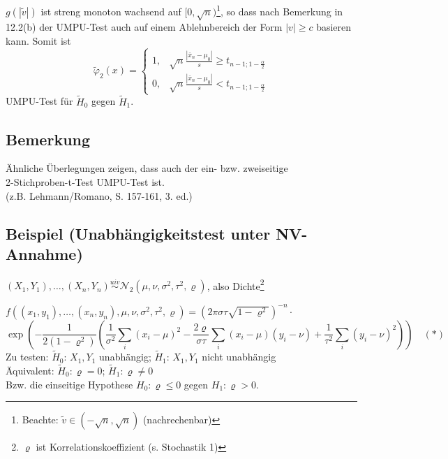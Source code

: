 \documentclass[a4paper,11pt,twoside,titlepage]{article}
\newcommand\NN{ \mathcal{N} } %
\newcommand{\uiv}{\ensuremath{\stackrel{uiv}{\sim}}}
\begin{document}
\begin{itemize}
$g(|\tilde v|)$ ist streng monoton wachsend auf $[0,\sqrt n)$\footnote{Beachte: $\tilde v\in(-\sqrt n,\sqrt n)$ (nachrechenbar)}, so dass nach Bemerkung in 12.2(b) der UMPU-Test auch auf einem Ablehnbereich der Form $|v|\geq c$ basieren kann. Somit ist
$$\tilde\varphi_2(x)=\left\{\begin{array}{cl}
1,&\sqrt{n}\frac{|\bar{x}_n-\mu_0|}{s}\geq t_{n-1;1-\frac\alpha2}\\0,&\sqrt{n}\frac{|\bar{x}_n-\mu_0|}{s}< t_{n-1;1-\frac\alpha2}\end{array}\right.$$
UMPU-Test für $\tilde H_0$ gegen $\tilde H_1$.
\end{itemize}

\subsection{Bemerkung}
Ähnliche Überlegungen zeigen, dass auch der ein- bzw. zweiseitige\\ 2-Stichproben-t-Test UMPU-Test ist.\\
(z.B. Lehmann/Romano, S. 157-161, 3. ed.)

\subsection{Beispiel (Unabhängigkeitstest unter NV-Annahme)}
$(X_1,Y_1),\ldots,(X_n,Y_n)\uiv\NN_2(\mu,\nu,\sigma^2,\tau^2,\varrho)$, also Dichte\footnote{$\varrho$ ist Korrelationskoeffizient (s. Stochastik 1)}

$f((x_1,y_1),\ldots,(x_n,y_n),\mu,\nu,\sigma^2,\tau^2,\varrho)=(2\pi\sigma\tau\sqrt{1-\varrho^2})^{-n}\cdot$\[\exp(-\frac{1}{2(1-\varrho^2)}(\frac{1}{\sigma^2}\sum_i(x_i-\mu)^2-\frac{2\varrho}{\sigma\tau}\sum_i(x_i-\mu)(y_i-\nu)+\frac{1}{\tau^2}\sum_i(y_i-\nu)^2))\quad(\ast)\]
Zu testen: $\tilde H_0$: $X_1,Y_1$ unabhängig; $\tilde H_1$: $X_1,Y_1$ nicht unabhängig\\
Äquivalent: $\tilde H_0: \varrho=0$; $\tilde H_1: \varrho\neq0$\\
Bzw. die einseitige Hypothese $H_0:\varrho\leq 0$ gegen $H_1:\varrho>0$.
\end{document}
